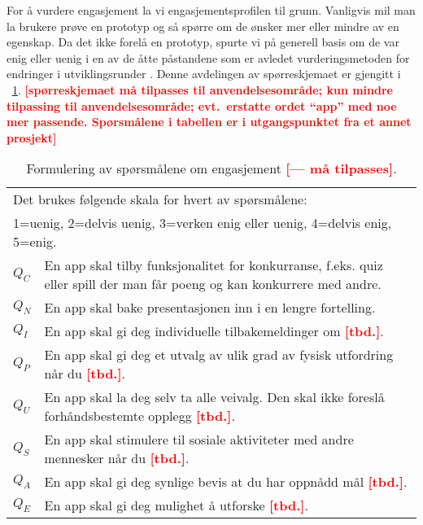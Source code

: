 \documentclass[11pt,english]{nik}
\newcommand{\WVL}[1]{\textbf{\textcolor{red}{#1}}}
\begin{document}

For å vurdere engasjement la vi engasjementsprofilen til
grunn. Vanligvis mil man la brukere prøve en prototyp og så spørre
om de ønsker mer eller mindre av en
egenskap. Da det ikke forelå en prototyp, spurte vi på generell basis
om de var enig eller uenig
i en av de åtte påstandene som er avledet vurderingsmetoden for
endringer i utviklingsrunder \autocite{aDesignProcess}.
Denne avdelingen
av spørreskjemaet er gjengitt i \tablename~\ref{tab:questions:opinion}.
\WVL{[spørreskjemaet må tilpasses til anvendelsesområde;
kun mindre tilpassing til anvendelsesområde; evt.\ erstatte ordet ``app'' med noe mer passende. 
Spørsmålene i tabellen er i utgangspunktet fra et annet prosjekt]}


\begin{table}
    \caption{Formulering av spørsmålene om engasjement \WVL{[--- må tilpasses]}.} \label{tab:questions:opinion}
\centering\small
\begin{tabular}{lp{.9\hsize}}
\multicolumn{2}{p{.99\hsize}}{Det brukes følgende skala for hvert av spørsmålene:}\\ 
\multicolumn{2}{p{.99\hsize}}{1=uenig, 2=delvis uenig, 3=verken enig eller uenig, 4=delvis enig, 5=enig.}\\
\hline
\(Q_C\) & En app skal tilby funksjonalitet for konkurranse, f.eks. quiz eller spill der man får poeng
og kan konkurrere med andre. \\
\(Q_N\) & En app skal bake presentasjonen inn i en lengre fortelling. \\
\(Q_I\) & En app skal gi deg individuelle tilbakemeldinger om \WVL{[tbd.]}. \\
\(Q_P\) &En app skal gi deg et utvalg av ulik grad av fysisk utfordring når du \WVL{[tbd.]}. \\
\(Q_U\) & En app skal la deg selv ta alle veivalg. Den skal ikke foreslå forhåndsbestemte opplegg \WVL{[tbd.]}. \\
\(Q_S\) & En app skal stimulere til sosiale aktiviteter med andre mennesker når du  \WVL{[tbd.]}. \\
\(Q_A\) & En app skal gi deg synlige bevis at du har oppnådd mål \WVL{[tbd.]}. \\
\(Q_E\) & En app skal gi deg mulighet å utforske \WVL{[tbd.]}.
\end{tabular}
\end{table}
\end{document}
